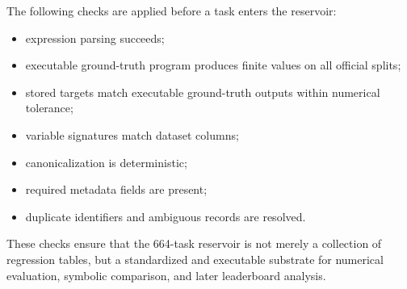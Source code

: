 The following checks are applied before a task enters the reservoir:
\begin{itemize}
    \item expression parsing succeeds;
    \item executable ground-truth program produces finite values on all official splits;
    \item stored targets match executable ground-truth outputs within numerical tolerance;
    \item variable signatures match dataset columns;
    \item canonicalization is deterministic;
    \item required metadata fields are present;
    \item duplicate identifiers and ambiguous records are resolved.
\end{itemize}

These checks ensure that the 664-task reservoir is not merely a collection of regression tables, but a standardized and executable substrate for numerical evaluation, symbolic comparison, and later leaderboard analysis.
